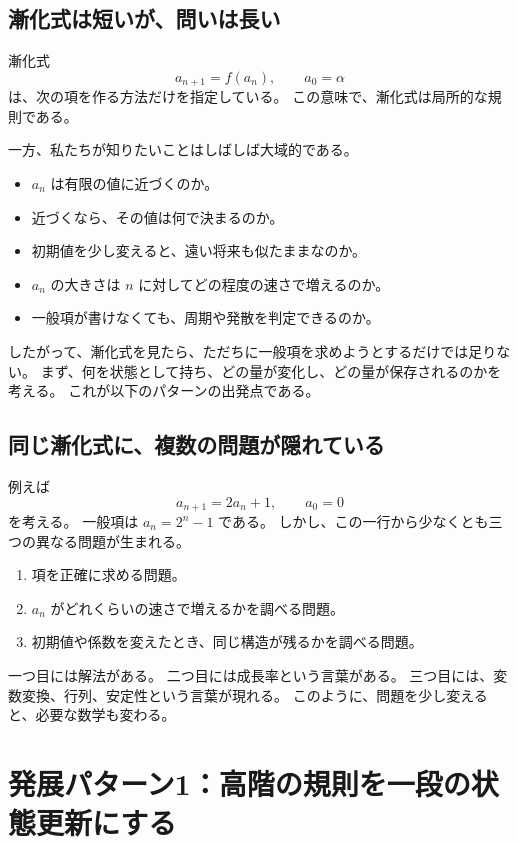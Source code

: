 \subsection{漸化式は短いが、問いは長い}

漸化式
\[
  a_{n+1}=f(a_n),\qquad a_0=\alpha
\]
は、次の項を作る方法だけを指定している。
この意味で、漸化式は局所的な規則である。

一方、私たちが知りたいことはしばしば大域的である。

\begin{itemize}
  \item $a_n$ は有限の値に近づくのか。
  \item 近づくなら、その値は何で決まるのか。
  \item 初期値を少し変えると、遠い将来も似たままなのか。
  \item $a_n$ の大きさは $n$ に対してどの程度の速さで増えるのか。
  \item 一般項が書けなくても、周期や発散を判定できるのか。
\end{itemize}

したがって、漸化式を見たら、ただちに一般項を求めようとするだけでは足りない。
まず、何を状態として持ち、どの量が変化し、どの量が保存されるのかを考える。
これが以下のパターンの出発点である。

\subsection{同じ漸化式に、複数の問題が隠れている}

例えば
\[
  a_{n+1}=2a_n+1,\qquad a_0=0
\]
を考える。
一般項は $a_n=2^n-1$ である。
しかし、この一行から少なくとも三つの異なる問題が生まれる。

\begin{enumerate}
  \item 項を正確に求める問題。
  \item $a_n$ がどれくらいの速さで増えるかを調べる問題。
  \item 初期値や係数を変えたとき、同じ構造が残るかを調べる問題。
\end{enumerate}

一つ目には解法がある。
二つ目には成長率という言葉がある。
三つ目には、変数変換、行列、安定性という言葉が現れる。
このように、問題を少し変えると、必要な数学も変わる。

\section{発展パターン1：高階の規則を一段の状態更新にする}

